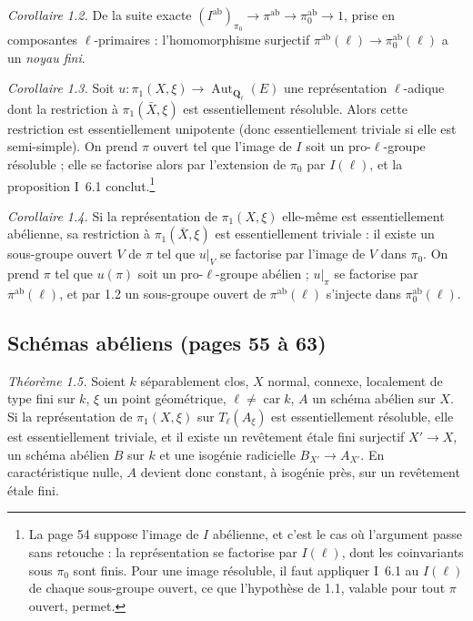 \documentclass[11pt,a4paper]{article}
\begin{document}
\emph{Corollaire 1.2.} De la suite exacte $(I^{\mathrm{ab}})_{\pi_0} \to
\pi^{\mathrm{ab}} \to \pi_0^{\mathrm{ab}} \to 1$, prise en composantes
$\ell$-primaires : l'homomorphisme surjectif $\pi^{\mathrm{ab}}(\ell) \to
\pi_0^{\mathrm{ab}}(\ell)$ a un \emph{noyau fini}.

\emph{Corollaire 1.3.} Soit $u : \pi_1(X,\xi) \to \operatorname{Aut}_{\mathbf{Q}_\ell}(E)$
une représentation $\ell$-adique dont la restriction à $\pi_1(\bar X,\xi)$ est
essentiellement résoluble. Alors cette restriction est essentiellement
unipotente (donc essentiellement triviale si elle est semi-simple). On prend
$\pi$ ouvert tel que l'image de $I$ soit un pro-$\ell$-groupe résoluble ; elle
se factorise alors par l'extension de $\pi_0$ par $I(\ell)$, et la proposition
I~6.1 conclut.\footnote{La page 54 suppose l'image de $I$ abélienne, et c'est
le cas où l'argument passe sans retouche : la représentation se factorise par
$I(\ell)$, dont les coinvariants sous $\pi_0$ sont finis. Pour une image
résoluble, il faut appliquer I~6.1 au $I(\ell)$ de chaque sous-groupe ouvert,
ce que l'hypothèse de 1.1, valable pour tout $\pi$ ouvert, permet.}

\emph{Corollaire 1.4.} Si la représentation de $\pi_1(X,\xi)$ elle-même est
essentiellement abélienne, sa restriction à $\pi_1(\bar X,\xi)$ est
essentiellement triviale : il existe un sous-groupe ouvert $V$ de $\pi$ tel que
$u|_V$ se factorise par l'image de $V$ dans $\pi_0$. On prend $\pi$ tel que
$u(\pi)$ soit un pro-$\ell$-groupe abélien ; $u|_\pi$ se factorise par
$\pi^{\mathrm{ab}}(\ell)$, et par 1.2 un sous-groupe ouvert de
$\pi^{\mathrm{ab}}(\ell)$ s'injecte dans $\pi_0^{\mathrm{ab}}(\ell)$.

\subsection*{Schémas abéliens (pages 55 à 63)}

\emph{Théorème 1.5.} Soient $k$ séparablement clos, $X$ normal, connexe,
localement de type fini sur $k$, $\xi$ un point géométrique, $\ell \neq
\operatorname{car} k$, $A$ un schéma abélien sur $X$. Si la représentation de
$\pi_1(X,\xi)$ sur $T_\ell(A_\xi)$ est essentiellement résoluble, elle est
essentiellement triviale, et il existe un revêtement étale fini surjectif
$X' \to X$, un schéma abélien $B$ sur $k$ et une isogénie radicielle
$B_{X'} \to A_{X'}$. En caractéristique nulle, $A$ devient donc constant, à
isogénie près, sur un revêtement étale fini.
\end{document}
